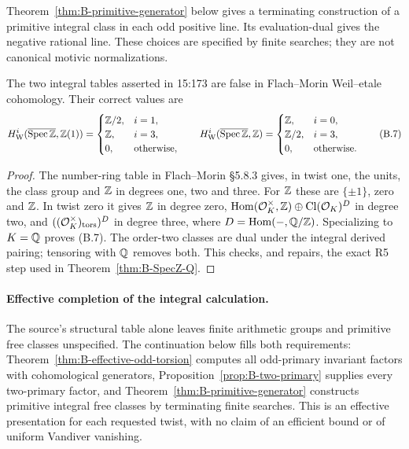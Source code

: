 Theorem~\ref{thm:B-primitive-generator} below gives a terminating
construction of a primitive integral class in each odd positive line.
Its evaluation-dual gives the negative rational line.  These choices
are specified by finite searches; they are not canonical motivic
normalizations.

\begin{proposition}\label{prop:B-integral-errors}
The two integral tables asserted in 15:173 are false in Flach--Morin
Weil--etale cohomology.  Their correct values are
\[
H^i_{\mathrm W}(\overline{\operatorname{Spec}\mathbb Z},\mathbb Z(1))=
\begin{cases}\mathbb Z/2,&i=1,\\\mathbb Z,&i=3,\\0,&\text{otherwise},\end{cases}
\qquad
H^i_{\mathrm W}(\overline{\operatorname{Spec}\mathbb Z},\mathbb Z)=
\begin{cases}\mathbb Z,&i=0,\\\mathbb Z/2,&i=3,\\0,&\text{otherwise}.\end{cases}\tag{B.7}
\]
\end{proposition}
\begin{proof}
The number-ring table in Flach--Morin \S5.8.3 gives, in twist one,
the units, the class group and \(\mathbb Z\) in degrees one, two and three.
For \(\mathbb Z\) these are \(\{\pm1\}\), zero and \(\mathbb Z\).
In twist zero it gives \(\mathbb Z\) in degree zero,
\(\operatorname{Hom}(\mathcal O_K^\times,\mathbb Z)\oplus\operatorname{Cl}(\mathcal O_K)^D\)
in degree two, and \(((\mathcal O_K^\times)_{\rm tors})^D\) in degree
three, where \(D=\operatorname{Hom}(-,\mathbb Q/\mathbb Z)\).  Specializing to \(K=\mathbb Q\)
proves (B.7).  The order-two classes are dual under the integral derived
pairing; tensoring with \(\mathbb Q\) removes both.  This checks, and repairs,
the exact R5 step used in Theorem~\ref{thm:B-SpecZ-Q}.
\end{proof}

\paragraph{Effective completion of the integral calculation.}
The source's structural table alone leaves finite arithmetic groups
and primitive free classes unspecified.  The continuation below fills
both requirements: Theorem~\ref{thm:B-effective-odd-torsion} computes
all odd-primary invariant factors with cohomological generators,
Proposition~\ref{prop:B-two-primary} supplies every two-primary
factor, and Theorem~\ref{thm:B-primitive-generator} constructs
primitive integral free classes by terminating finite searches.
This is an effective presentation for each requested twist, with no
claim of an efficient bound or of uniform Vandiver vanishing.

